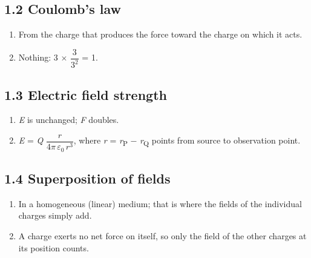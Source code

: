 \documentclass[11pt]{article}
\begin{document}
\begin{keepsection}\subsection{1.2 Coulomb’s law}

\begin{enumerate}
\item From the charge that produces the force toward the charge on which it acts.
\item Nothing: 3 \ensuremath{\times} {\small\ensuremath{\dfrac{3}{3^{2}}}} = 1.
\end{enumerate}

\end{keepsection}
\begin{keepsection}\subsection{1.3 Electric field strength}

\begin{enumerate}
\item \textit{E} is unchanged; \textit{F} doubles.
\item \textit{E} = \textit{Q} {\small\ensuremath{\dfrac{{r}}{4π\, ε_{0}\, {r}^{3}}}}, where \textit{r} = \textit{r}\textsubscript{P} \ensuremath{-} \textit{r}\textsubscript{Q} points from source to observation point.
\end{enumerate}

\end{keepsection}
\begin{keepsection}\subsection{1.4 Superposition of fields}

\begin{enumerate}
\item In a homogeneous (linear) medium; that is where the fields of the individual charges simply add.
\item A charge exerts no net force on itself, so only the field of the other charges at its position counts.
\end{enumerate}

\end{keepsection}
\end{document}
